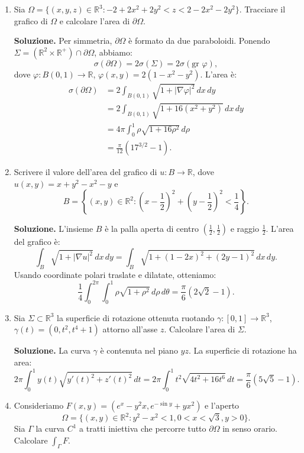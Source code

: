 \begin{enumerate}
	
	\item Sia $\Omega = \{(x,y,z) \in \mathbb{R}^3 : -2 + 2x^2 + 2y^2 < z < 2 - 2x^2 - 2y^2\}$. Tracciare il grafico di $\Omega$ e calcolare l'area di $\partial \Omega$.
	
	\textbf{Soluzione.}
		Per simmetria, $\partial \Omega$ è formato da due paraboloidi. Ponendo $\Sigma = (\mathbb{R}^2 \times \mathbb{R}^+) \cap \partial \Omega$, abbiamo:
		\[
		\sigma(\partial \Omega) = 2\sigma(\Sigma) = 2\sigma(\text{gr } \varphi),
		\]
		dove $\varphi: B(0,1) \to \mathbb{R}$, $\varphi(x,y) = 2(1 - x^2 - y^2)$. L'area è:
		\[
		\begin{aligned}
			\sigma(\partial \Omega) &= 2 \int_{B(0,1)} \sqrt{1 + |\nabla \varphi|^2} \, dx \, dy \\
			&= 2 \int_{B(0,1)} \sqrt{1 + 16(x^2 + y^2)} \, dx \, dy \\
			&= 4\pi \int_0^1 \rho \sqrt{1 + 16\rho^2} \, d\rho \\
			&= \frac{\pi}{12} \left(17^{3/2} - 1\right).
		\end{aligned}
		\]
	
	
	\item Scrivere il valore dell'area del grafico di $u: B \to \mathbb{R}$, dove $u(x,y) = x + y^2 - x^2 - y$ e
	\[
	B = \left\{(x,y) \in \mathbb{R}^2 : \left(x - \frac{1}{2}\right)^2 + \left(y - \frac{1}{2}\right)^2 < \frac{1}{4}\right\}.
	\]
	
	\textbf{Soluzione.}
		L'insieme $B$ è la palla aperta di centro $\left(\frac{1}{2}, \frac{1}{2}\right)$ e raggio $\frac{1}{2}$. L'area del grafico è:
		\[
		\int_B \sqrt{1 + |\nabla u|^2} \, dx \, dy = \int_B \sqrt{1 + (1 - 2x)^2 + (2y - 1)^2} \, dx \, dy.
		\]
		Usando coordinate polari traslate e dilatate, otteniamo:
		\[
		\frac{1}{4} \int_0^{2\pi} \int_0^1 \rho \sqrt{1 + \rho^2} \, d\rho \, d\theta = \frac{\pi}{6} (2\sqrt{2} - 1).
		\]
	
	
	\item Sia $\Sigma \subset \mathbb{R}^3$ la superficie di rotazione ottenuta ruotando $\gamma: [0,1] \to \mathbb{R}^3$, $\gamma(t) = (0, t^2, t^4 + 1)$ attorno all'asse $z$. Calcolare l'area di $\Sigma$.
	
	\textbf{Soluzione.}
		La curva $\gamma$ è contenuta nel piano $yz$. La superficie di rotazione ha area:
		\[
		2\pi \int_0^1 y(t) \sqrt{y'(t)^2 + z'(t)^2} \, dt = 2\pi \int_0^1 t^2 \sqrt{4t^2 + 16t^6} \, dt = \frac{\pi}{6} (5\sqrt{5} - 1).
		\]
	
	
	\item Consideriamo $F(x,y) = (e^x - y^2 x, e^{-\sin y} + yx^2)$ e l'aperto
	\[
	\Omega = \{(x,y) \in \mathbb{R}^2 : y^2 - x^2 < 1, 0 < x < \sqrt{3}, y > 0\}.
	\]
	Sia $\Gamma$ la curva $C^1$ a tratti iniettiva che percorre tutto $\partial \Omega$ in senso orario. Calcolare $\int_{\Gamma} F$.
	

\end{enumerate}
